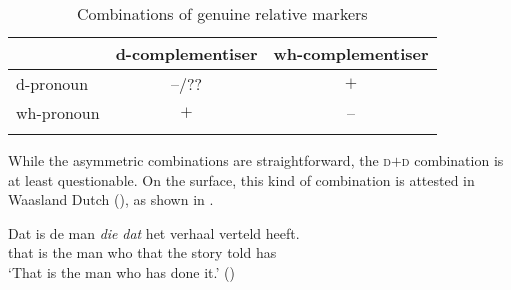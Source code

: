 \documentclass[output=paper]{langscibook}
\begin{document}
\begin{table}
\caption{Combinations of genuine relative markers}
\label{bacsk:tab:markers}
 \begin{tabularx}{.8\textwidth}{lcc}
  \lsptoprule
            & d-complementiser & wh-complementiser\\
  \midrule
  d-pronoun  &   --/?? & $+$\\
  wh-pronoun  &   $+$ & --\\
  \lspbottomrule
 \end{tabularx}
\end{table}

While the asymmetric combinations are straightforward, the \textsc{d}$+$\textsc{d} combination is at least questionable. On the surface, this kind of combination is attested in Waasland Dutch (\citealt{boef2013}), as shown in .

\ea \gll Dat is de man \textit{die} \textit{dat} het verhaal verteld heeft. \label{bacsk:ex:dutch}\\
that is the man who that the story told has\\
\glt `That is the man who has done it.' \hfill (\citealt[93]{boef2008})
\z
\end{document}
